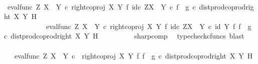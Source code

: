 \begin{isabellebody}
\isanewline
\ \ \ \ \isamarkupfalse%
\isanewline
\ \ \ \ \ \ \isamarkupfalse%
\ {\isachardoublequoteopen}{\isacharparenleft}{\kern0pt}eval{\isacharunderscore}{\kern0pt}func\ Z\ {\isacharparenleft}{\kern0pt}X\ {\isasymCoprod}\ Y{\isacharparenright}{\kern0pt}\ {\isasymcirc}\isactrlsub c\ right{\isacharunderscore}{\kern0pt}coproj\ X\ Y\ {\isasymtimes}\isactrlsub f\ id\isactrlsub c\ {\isacharparenleft}{\kern0pt}Z\isactrlbsup {\isacharparenleft}{\kern0pt}X\ {\isasymCoprod}\ Y{\isacharparenright}{\kern0pt}\isactrlesup {\isacharparenright}{\kern0pt}{\isacharparenright}{\kern0pt}\isactrlsup {\isasymsharp}\ {\isasymcirc}\isactrlsub c\ {\isacharparenleft}{\kern0pt}f\isactrlsup {\isasymflat}\ {\isasymamalg}\ g\isactrlsup {\isasymflat}\ {\isasymcirc}\isactrlsub c\ dist{\isacharunderscore}{\kern0pt}prod{\isacharunderscore}{\kern0pt}coprod{\isacharunderscore}{\kern0pt}right\ X\ Y\ H{\isacharparenright}{\kern0pt}\isactrlsup {\isasymsharp}\ {\isacharequal}{\kern0pt}\ \isanewline
\ \ \ \ \ \ \ \ \ \ \ \ {\isacharparenleft}{\kern0pt}{\isacharparenleft}{\kern0pt}eval{\isacharunderscore}{\kern0pt}func\ Z\ {\isacharparenleft}{\kern0pt}X\ {\isasymCoprod}\ Y{\isacharparenright}{\kern0pt}\ {\isasymcirc}\isactrlsub c\ right{\isacharunderscore}{\kern0pt}coproj\ X\ Y\ {\isasymtimes}\isactrlsub f\ id\isactrlsub c\ {\isacharparenleft}{\kern0pt}Z\isactrlbsup {\isacharparenleft}{\kern0pt}X\ {\isasymCoprod}\ Y{\isacharparenright}{\kern0pt}\isactrlesup {\isacharparenright}{\kern0pt}{\isacharparenright}{\kern0pt}\ {\isasymcirc}\isactrlsub c\ {\isacharparenleft}{\kern0pt}id\ Y\ {\isasymtimes}\isactrlsub f\ {\isacharparenleft}{\kern0pt}f\isactrlsup {\isasymflat}\ {\isasymamalg}\ g\isactrlsup {\isasymflat}\ {\isasymcirc}\isactrlsub c\ dist{\isacharunderscore}{\kern0pt}prod{\isacharunderscore}{\kern0pt}coprod{\isacharunderscore}{\kern0pt}right\ X\ Y\ H{\isacharparenright}{\kern0pt}\isactrlsup {\isasymsharp}{\isacharparenright}{\kern0pt}{\isacharparenright}{\kern0pt}\isactrlsup {\isasymsharp}{\isachardoublequoteclose}\isanewline
\ \ \ \ \ \ \ \ \isamarkupfalse%
\ sharp{\isacharunderscore}{\kern0pt}comp\ \isamarkupfalse%
\ {\isacharparenleft}{\kern0pt}typecheck{\isacharunderscore}{\kern0pt}cfuncs{\isacharcomma}{\kern0pt}\ blast{\isacharparenright}{\kern0pt}\isanewline
\ \ \ \ \ \ \isamarkupfalse%
\ \isamarkupfalse%
\ {\isachardoublequoteopen}{\isachardot}{\kern0pt}{\isachardot}{\kern0pt}{\isachardot}{\kern0pt}\ {\isacharequal}{\kern0pt}\ {\isacharparenleft}{\kern0pt}eval{\isacharunderscore}{\kern0pt}func\ Z\ {\isacharparenleft}{\kern0pt}X\ {\isasymCoprod}\ Y{\isacharparenright}{\kern0pt}\ {\isasymcirc}\isactrlsub c\ \ {\isacharparenleft}{\kern0pt}right{\isacharunderscore}{\kern0pt}coproj\ X\ Y\ {\isasymtimes}\isactrlsub f\ {\isacharparenleft}{\kern0pt}f\isactrlsup {\isasymflat}\ {\isasymamalg}\ g\isactrlsup {\isasymflat}\ {\isasymcirc}\isactrlsub c\ dist{\isacharunderscore}{\kern0pt}prod{\isacharunderscore}{\kern0pt}coprod{\isacharunderscore}{\kern0pt}right\ X\ Y\ H{\isacharparenright}{\kern0pt}\isactrlsup {\isasymsharp}{\isacharparenright}{\kern0pt}{\isacharparenright}{\kern0pt}\isactrlsup {\isasymsharp}{\isachardoublequoteclose}\isanewline

\end{isabellebody}
